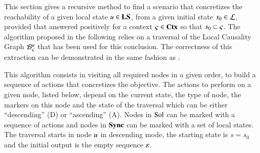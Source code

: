 This section gives a recursive method to find a scenario that concretizes
the reachability of a given local state $u \in \mathbf{LS}$,
from a given initial state $s_0 \in \mathcal{L}$,
provided that  answered positively
for a context $\varsigma \in \mathbf{Ctx}$ so that $s_0 \subset \varsigma$.
The algorithm proposed in the following relies on a traversal of the Local Causality Graph
${\mathcal{B}_{\varsigma}^{u}}$ that has been used for this conclusion.
The correctness of this extraction can be demonstrated
in the same fashion as .

This algorithm consists in visiting all required nodes in a given order,
to build a sequence of actions that concretizes the objective.
The actions to perform on a given node,
listed below,
depend on the current state, the type of node, the markers on this node
and the state of the traversal which can be either “descending” (D) or “ascending” (A).
Nodes in $\mathrm{Sol}$ can be marked with a sequence of actions
and nodes in $\mathbf{Sync}$ can be marked with a set of local states.
The traversal starts in node $u$ in descending mode,
the starting state is $s = s_0$
and the initial output is the empty sequence $\varepsilon$.

